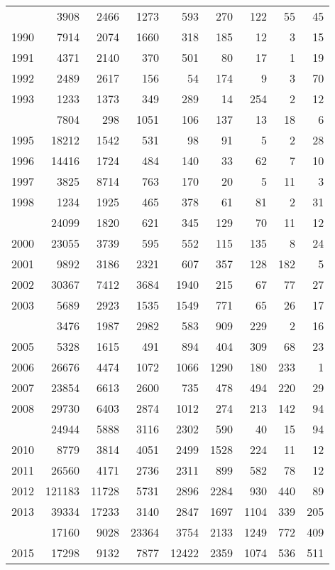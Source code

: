 \documentclass[
]{article}
\begin{document}
\begin{longtable}[t]{lrrrrrrrr}
\endfoot
\bottomrule
\endlastfoot
1989 & 3908 & 2466 & 1273 & 593 & 270 & 122 & 55 & 45\\
1990 & 7914 & 2074 & 1660 & 318 & 185 & 12 & 3 & 15\\
1991 & 4371 & 2140 & 370 & 501 & 80 & 17 & 1 & 19\\
1992 & 2489 & 2617 & 156 & 54 & 174 & 9 & 3 & 70\\
1993 & 1233 & 1373 & 349 & 289 & 14 & 254 & 2 & 12\\
\addlinespace
1994 & 7804 & 298 & 1051 & 106 & 137 & 13 & 18 & 6\\
1995 & 18212 & 1542 & 531 & 98 & 91 & 5 & 2 & 28\\
1996 & 14416 & 1724 & 484 & 140 & 33 & 62 & 7 & 10\\
1997 & 3825 & 8714 & 763 & 170 & 20 & 5 & 11 & 3\\
1998 & 1234 & 1925 & 465 & 378 & 61 & 81 & 2 & 31\\
\addlinespace
1999 & 24099 & 1820 & 621 & 345 & 129 & 70 & 11 & 12\\
2000 & 23055 & 3739 & 595 & 552 & 115 & 135 & 8 & 24\\
2001 & 9892 & 3186 & 2321 & 607 & 357 & 128 & 182 & 5\\
2002 & 30367 & 7412 & 3684 & 1940 & 215 & 67 & 77 & 27\\
2003 & 5689 & 2923 & 1535 & 1549 & 771 & 65 & 26 & 17\\
\addlinespace
2004 & 3476 & 1987 & 2982 & 583 & 909 & 229 & 2 & 16\\
2005 & 5328 & 1615 & 491 & 894 & 404 & 309 & 68 & 23\\
2006 & 26676 & 4474 & 1072 & 1066 & 1290 & 180 & 233 & 1\\
2007 & 23854 & 6613 & 2600 & 735 & 478 & 494 & 220 & 29\\
2008 & 29730 & 6403 & 2874 & 1012 & 274 & 213 & 142 & 94\\
\addlinespace
2009 & 24944 & 5888 & 3116 & 2302 & 590 & 40 & 15 & 94\\
2010 & 8779 & 3814 & 4051 & 2499 & 1528 & 224 & 11 & 12\\
2011 & 26560 & 4171 & 2736 & 2311 & 899 & 582 & 78 & 12\\
2012 & 121183 & 11728 & 5731 & 2896 & 2284 & 930 & 440 & 89\\
2013 & 39334 & 17233 & 3140 & 2847 & 1697 & 1104 & 339 & 205\\
\addlinespace
2014 & 17160 & 9028 & 23364 & 3754 & 2133 & 1249 & 772 & 409\\
2015 & 17298 & 9132 & 7877 & 12422 & 2359 & 1074 & 536 & 511\\

\end{longtable}
\end{document}
